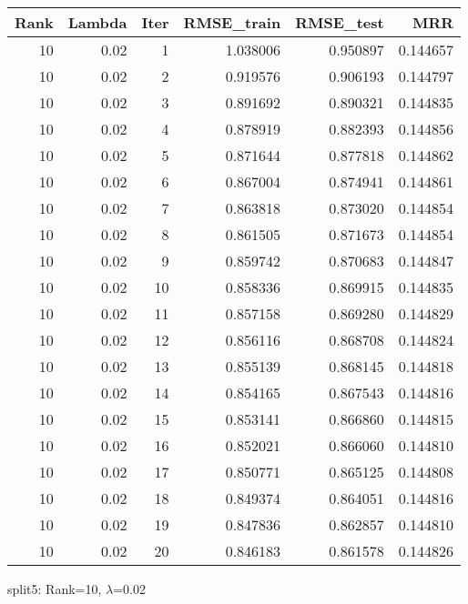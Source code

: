 \begin{tabular}{rrrrrr}
\toprule
 Rank &  Lambda &  Iter &  RMSE\_train &  RMSE\_test &       MRR \\
\midrule
   10 &    0.02 &     1 &    1.038006 &   0.950897 &  0.144657 \\
   10 &    0.02 &     2 &    0.919576 &   0.906193 &  0.144797 \\
   10 &    0.02 &     3 &    0.891692 &   0.890321 &  0.144835 \\
   10 &    0.02 &     4 &    0.878919 &   0.882393 &  0.144856 \\
   10 &    0.02 &     5 &    0.871644 &   0.877818 &  0.144862 \\
   10 &    0.02 &     6 &    0.867004 &   0.874941 &  0.144861 \\
   10 &    0.02 &     7 &    0.863818 &   0.873020 &  0.144854 \\
   10 &    0.02 &     8 &    0.861505 &   0.871673 &  0.144854 \\
   10 &    0.02 &     9 &    0.859742 &   0.870683 &  0.144847 \\
   10 &    0.02 &    10 &    0.858336 &   0.869915 &  0.144835 \\
   10 &    0.02 &    11 &    0.857158 &   0.869280 &  0.144829 \\
   10 &    0.02 &    12 &    0.856116 &   0.868708 &  0.144824 \\
   10 &    0.02 &    13 &    0.855139 &   0.868145 &  0.144818 \\
   10 &    0.02 &    14 &    0.854165 &   0.867543 &  0.144816 \\
   10 &    0.02 &    15 &    0.853141 &   0.866860 &  0.144815 \\
   10 &    0.02 &    16 &    0.852021 &   0.866060 &  0.144810 \\
   10 &    0.02 &    17 &    0.850771 &   0.865125 &  0.144808 \\
   10 &    0.02 &    18 &    0.849374 &   0.864051 &  0.144816 \\
   10 &    0.02 &    19 &    0.847836 &   0.862857 &  0.144810 \\
   10 &    0.02 &    20 &    0.846183 &   0.861578 &  0.144826 \\
\bottomrule
\end{tabular}

\caption{split5: Rank=10, $\lambda$=0.02}
